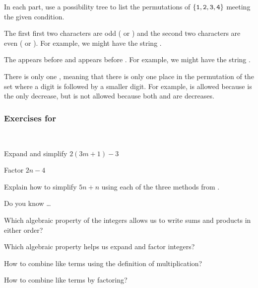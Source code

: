 \begin{exer} [\exerE]%
\label{exer_restricted_perms}
    In each part, use a possibility tree to list the permutations of 
    $\{\texttt{1},\texttt{2},\texttt{3},\texttt{4}\}$
    meeting the given condition.  
    \begin{exerpart}
        \item The first first two characters are odd ( or ) and the second two characters are even ( or ). For example, we might have the string .
        \item The  appears before  and  appears before . For example, we might have the string .
        \item There is only one , meaning that there is only one place in the permutation of the set where a digit is followed by a smaller digit.  For example,  is allowed because  is the only decrease, but  is not allowed because both  and  are decreases. 
    \end{exerpart}
\end{exer}


\subsubsection*{Exercises for  \subintalgebra} 

\begin{exer} [\exerP]%
\label{exer_integer_algebra}
~
\begin{exerpart}
    \item Expand and simplify $2(3m+1)-3$
    \item Factor $2n-4$
\end{exerpart}
\end{exer}

\begin{exer} [\exerU]%
\label{exer_3ways_combine_like_terms}
    Explain how to simplify $5n+n$ using each of the three methods from .
\end{exer}

\begin{exer}[\exerR] %
\label{exer_dyk_alg_orderops}
    Do you know \ldots
        \begin{exerpart}
            \item Which algebraic property of the integers allows us to write sums and products in either order?
            \item Which algebraic property helps us expand and factor integers?
            \item How to combine like terms using the definition of multiplication?
            \item How to combine like terms by factoring?
        \end{exerpart}
\end{exer}

